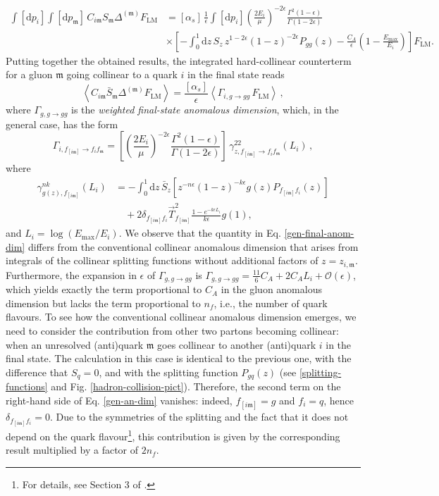 \documentclass[a4paper, 12pt]{book}
\newcommand{\um}{\mathfrak{m}}
\begin{document}
\begin{align}
  \int [\mathrm{d}p_i] \int [\mathrm{d}p_\um] \, C_{i\um} S_{\um} \Delta^{(\um)} F_{\mathrm{LM}} 
  &= [\alpha_s] \, \frac{1}{\epsilon} \int[\mathrm{d}p_i] \left(\frac{2E_i}{\mu} \right)^{-2\epsilon} \frac{\Gamma^2(1-\epsilon)}{\Gamma(1-2\epsilon)} \nonumber \\
  & \times \left[ - \int_0^1 \mathrm{d}z \, S_z \, z^{1-2\epsilon} (1-z)^{-2\epsilon} P_{gg}(z) - \frac{C_A}{\epsilon} \left(1-\frac{E_{\text{max}}}{E_i}\right) \right] F_{\mathrm{LM}} .
\end{align}
Putting together the obtained results, the integrated hard-collinear counterterm for a gluon $\um$ going collinear to a quark $i$ in the final state reads
\begin{equation}
  \left<  C_{i\um} \bar{S}_{\um} \Delta^{(\um)} F_{\mathrm{LM}}\right> = \frac{[\alpha_s]}{\epsilon} \left< \Gamma_{i,g \to gg} \, F_{\mathrm{LM}}\right> \, ,
\end{equation}
where $\Gamma_{g,g \to gg}$ is the \emph{weighted final-state anomalous dimension}, which, in the general case, has the form
\begin{equation}
  \Gamma_{i,f_{[i\um]}\to f_i f_\um} = \left[\left(\frac{2E_i}{\mu}\right)^{-2\epsilon} \frac{\Gamma^2(1-\epsilon)}{\Gamma(1-2\epsilon)}\right] \, \gamma^{22}_{z,f_{[i\um]} \to f_i f_\um} (L_i) \, ,
  \label{gen-final-anom-dim}
\end{equation}
where 
\begin{align}
  \gamma^{nk}_{g(z),f_{[i\um]}} (L_i) 
  &= - \int_0^1 \mathrm{d}z \, \bar{S}_z \left[z^{-n\epsilon}(1-z)^{-k\epsilon}g(z)P_{f_{[i\um]}f_i}(z)\right] \nonumber \\
  &\quad + 2 \delta_{f_{[i\um]}f_i} \vec{T}^2_{f_{[i\um]}} \frac{1-e^{-k \epsilon L_i}}{k\epsilon} g(1) ,
  \label{gen-an-dim}
\end{align}
and $L_i=\log{\left(E_{\mathrm{max}}/E_i\right)}$. We observe that the quantity in Eq. \ref{gen-final-anom-dim} differs from the conventional collinear anomalous dimension that arises from integrals of the collinear splitting functions without additional factors of $z=z_{i,\um}$. Furthermore, the expansion in $\epsilon$ of $\Gamma_{g,g \to gg}$ is $\Gamma_{g,g \to gg}=\frac{11}{6}C_A+2C_AL_i+\mathcal{O}(\epsilon)$, which yields exactly the term proportional to $C_A$ in the gluon anomalous dimension but lacks the term proportional to $n_f$, i.e., the number of quark flavours. To see how the conventional collinear anomalous dimension emerges, we need to consider the contribution from other two partons becoming collinear: when an unresolved (anti)quark $\um$ goes collinear to another (anti)quark $i$ in the final state. The calculation in this case is identical to the previous one, with the difference that $S_q = 0$, and with the splitting function $P_{gq}(z)$ (see \ref{splitting-functions} and Fig. \ref{hadron-collision-pict}). Therefore, the second term on the right-hand side of Eq. \ref{gen-an-dim} vanishes: indeed, $f_{[i\um]}=g$ and $f_i=q$, hence $\delta_{f_{[i\um]}f_i}=0$. Due to the symmetries of the splitting and the fact that it does not depend on the quark flavour\footnote{For details, see Section 3 of \cite{Devoto:2025kin}.}, this contribution is given by the corresponding result multiplied by a factor of $2n_f$.
\end{document}
